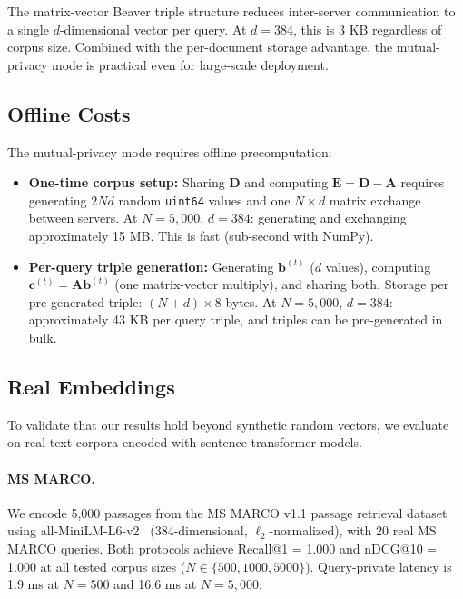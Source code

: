 \documentclass[11pt]{article}
\begin{document}
The matrix-vector Beaver triple structure reduces inter-server communication to a single $d$-dimensional vector per query. At $d = 384$, this is 3 KB regardless of corpus size. Combined with the per-document storage advantage, the mutual-privacy mode is practical even for large-scale deployment.

\subsection{Offline Costs}

The mutual-privacy mode requires offline precomputation:

\begin{itemize}[leftmargin=*]
\item \textbf{One-time corpus setup:} Sharing $\mathbf{D}$ and computing $\mathbf{E} = \mathbf{D} - \mathbf{A}$ requires generating $2Nd$ random \texttt{uint64} values and one $N \times d$ matrix exchange between servers. At $N = 5{,}000$, $d = 384$: generating and exchanging approximately 15 MB. This is fast (sub-second with NumPy).

\item \textbf{Per-query triple generation:} Generating $\mathbf{b}^{(t)}$ ($d$ values), computing $\mathbf{c}^{(t)} = \mathbf{A}\mathbf{b}^{(t)}$ (one matrix-vector multiply), and sharing both. Storage per pre-generated triple: $(N + d) \times 8$ bytes. At $N = 5{,}000$, $d = 384$: approximately 43 KB per query triple, and triples can be pre-generated in bulk.
\end{itemize}

\subsection{Real Embeddings}

To validate that our results hold beyond synthetic random vectors, we evaluate on real text corpora encoded with sentence-transformer models.

\paragraph{MS MARCO.} We encode 5{,}000 passages from the MS MARCO v1.1 passage retrieval dataset~\cite{nguyen2016ms} using all-MiniLM-L6-v2~\cite{reimers2019sentence} (384-dimensional, $\ell_2$-normalized), with 20 real MS MARCO queries. Both protocols achieve Recall@1 = 1.000 and nDCG@10 = 1.000 at all tested corpus sizes ($N \in \{500, 1000, 5000\}$). Query-private latency is 1.9 ms at $N = 500$ and 16.6 ms at $N = 5{,}000$.
\end{document}
